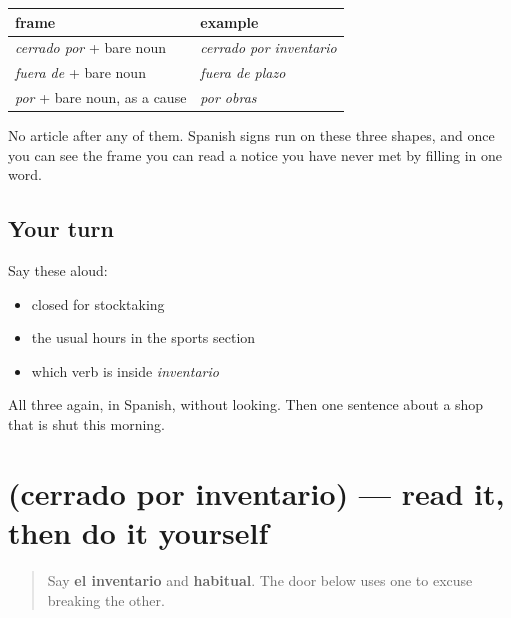 \begin{grammarlens}[title={Grammar Lens: the notice frames, collected}]
\noindent
\begin{tabularx}{\linewidth}{@{}>{\raggedright\arraybackslash}X>{\raggedright\arraybackslash}X@{}}
\toprule
\textbf{frame} & \textbf{example} \\
\midrule
\emph{cerrado por} + bare noun & \emph{cerrado por inventario} \\
\emph{fuera de} + bare noun & \emph{fuera de plazo} \\
\emph{por} + bare noun, as a cause & \emph{por obras} \\
\bottomrule
\end{tabularx}

No article after any of them. Spanish signs run on these three shapes, and once you can see the frame you can read a notice you have never met by filling in one word.
\end{grammarlens}

\subsection*{Your turn}
Say these aloud:

\begin{itemize}
\raggedright
  \item closed for stocktaking
  \item the usual hours in the sports section
  \item which verb is inside \emph{inventario}
\end{itemize}

\begin{tcolorbox}[breakable,colback=teal!4,colframe=teal!35!black,title={Before you move on}]
All three again, in Spanish, without looking. Then one sentence about a shop that is shut this morning.
\end{tcolorbox}
\section[Practice]{(cerrado por inventario) — read it, then do it yourself}

\label{lesson:ES-C459-sintesis-stock}



\begin{quote}
Say \textbf{el inventario} and \textbf{habitual}. The door below uses one to excuse breaking the other.
\end{quote}

